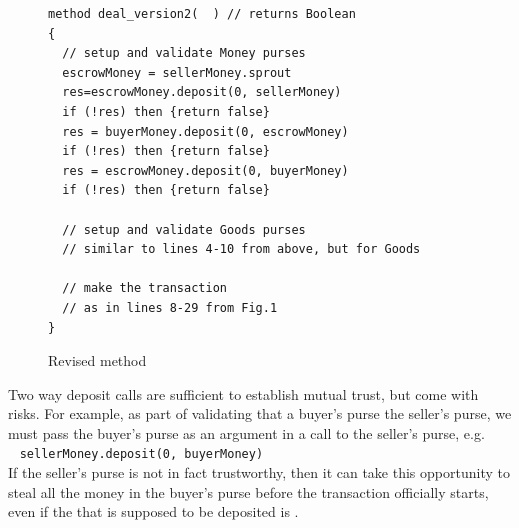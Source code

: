 
\begin{figure}[htb]
\begin{lstlisting}
method deal_version2(  ) // returns Boolean
{
  // setup and validate Money purses
  escrowMoney = sellerMoney.sprout
  res=escrowMoney.deposit(0, sellerMoney)
  if (!res) then {return false}
  res = buyerMoney.deposit(0, escrowMoney)
  if (!res) then {return false}
  res = escrowMoney.deposit(0, buyerMoney)
  if (!res) then {return false}

  // setup and validate Goods purses
  // similar to lines 4-10 from above, but for Goods

  // make the transaction
  // as in lines 8-29 from Fig.1
}
\end{lstlisting}
\vspace*{-7mm}
\caption{Revised  method}
\label{fig:DealV2}
\end{figure}


Two way deposit calls are sufficient to establish mutual trust,
but come with risks.
For example, as part of
validating that a buyer's  %
purse %
the seller's
purse, we must  pass the buyer's purse
as an argument in a
 call to the seller's %
purse, e.g.\\
%
~ \SP \lstinline+sellerMoney.deposit(0, buyerMoney)+\\
%
\noindent
If the seller's purse is not in fact trustworthy, then it can take this
opportunity to steal all the money in the buyer's purse before the
transaction officially starts, even if the  that is supposed
to be deposited is .

